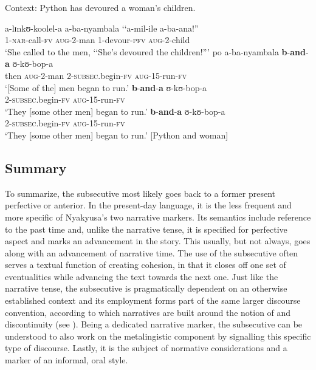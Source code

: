 \begin{exe}
\ex \label{exSubsecutiveRepetition} Context: Python has devoured a woman's children.
\begin{xlist}
\ex \gll a-lɪnkʊ-koolel-a a-ba-nyambala \textup{\lq\lq}a-mil-ile a-ba-ana!\textup{''}\\
1-\textsc{nar}-call-\textsc{fv} \textsc{aug}-2-man \phantom{\lq\lq}1-devour-\textsc{pfv} \textsc{aug}-2-child\\
\glt \lq She called to the men, \lq\lq She's devoured the children!''{}'
\ex \label{exSubsecutiveRepetitionSentence2}
\gll po a-ba-nyambala \textbf{b}-\textbf{and}-\textbf{a} ʊ-kʊ-bop-a\\
then \textsc{aug}-2-man 2-\textsc{subsec}.begin-\textsc{fv} \textsc{aug}-15-run-\textsc{fv}\\
\glt \lq [Some of the] men began to run.'
\ex \label{exSubsecutiveRepetitionSentence3} \gll \textbf{b}-\textbf{and}-\textbf{a} ʊ-kʊ-bop-a\\
2-\textsc{subsec}.begin-\textsc{fv} \textsc{aug}-15-run-\textsc{fv}\\
\glt \lq They [some other men] began to run.'
\ex \label{exSubsecutiveRepetitionSentence4}\gll \textbf{b}-\textbf{and}-\textbf{a} ʊ-kʊ-bop-a\\
2-\textsc{subsec}.begin-\textsc{fv} \textsc{aug}-15-run-\textsc{fv}\\
\glt \lq They [some other men] began to run.' [Python and woman]
\end{xlist}
\end{exe}

\subsection{Summary}
To summarize, the subsecutive most likely goes back to a former present perfective or anterior. In the present-day language, it is the less frequent and more specific of Nyakyusa's two narrative markers. Its semantics include reference to the past time and, unlike the narrative tense, it is specified for perfective aspect and marks an advancement in the story. This usually, but not always, goes along with an advancement of narrative time. The use of the subsecutive often serves a textual function of creating cohesion, in that it closes off one set of eventualities while advancing the text towards the next one. Just like the narrative tense, the subsecutive is pragmatically dependent on an otherwise established context and its employment forms part of the same larger discourse convention, according to which narratives are built around the notion of  and discontinuity (see ). Being a dedicated narrative marker, the subsecutive can be understood to also work on the metalingistic component by signalling this specific type of discourse. Lastly, it is the subject of normative considerations and a marker of an informal, oral style.
